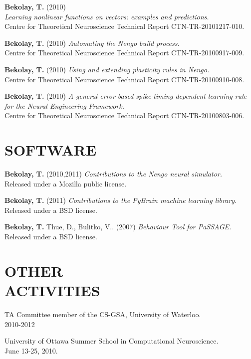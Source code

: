 \documentclass[line,margin]{res}
\begin{document}
\begin{resume}
  \textbf{Bekolay, T.} (2010) \\
    {\sl Learning nonlinear functions on vectors: examples and predictions.} \\
      Centre for Theoretical Neuroscience Technical Report CTN-TR-20101217-010.

  \textbf{Bekolay, T.} (2010)
    {\sl Automating the Nengo build process.} \\
    Centre for Theoretical Neuroscience Technical Report CTN-TR-20100917-009.

  \textbf{Bekolay, T.} (2010)
    {\sl Using and extending plasticity rules in Nengo.} \\
    Centre for Theoretical Neuroscience Technical Report CTN-TR-20100910-008.

  \textbf{Bekolay, T.} (2010)
    {\sl A general error-based spike-timing dependent learning rule for the Neural Engineering Framework.} \\
    Centre for Theoretical Neuroscience Technical Report CTN-TR-20100803-006.

\section{SOFTWARE}
  \textbf{Bekolay, T.} (2010,2011)
    {\sl Contributions to the Nengo neural simulator.} \\
    Released under a Mozilla public license.

  \textbf{Bekolay, T.} (2011)
    {\sl Contributions to the PyBrain machine learning library.} \\
    Released under a BSD license.

  \textbf{Bekolay, T.} Thue, D., Bulitko, V.. (2007)
    {\sl Behaviour Tool for PaSSAGE.} \\
    Released under a BSD license.

\section{OTHER \\ ACTIVITIES}
  TA Committee member of the CS-GSA, University of Waterloo. \\
  2010-2012

  University of Ottawa Summer School in Computational Neuroscience. \\
  June 13-25, 2010.

\end{resume}
\end{document}
